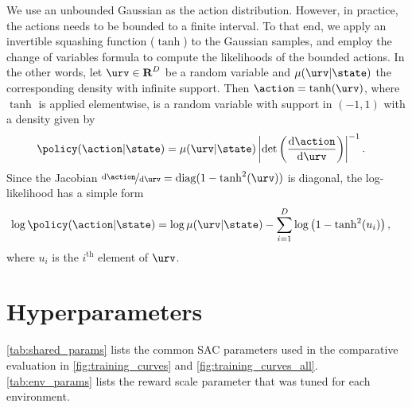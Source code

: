 \documentclass{article}
\begin{document}
%
We use an unbounded Gaussian as the action distribution. However, in practice, the actions needs to be bounded to a finite interval. To that end, we
apply an invertible squashing function 
($\tanh$) to the Gaussian samples, and employ the change of variables formula to compute the likelihoods of the bounded actions. In the other words, let $\urv\in\reals^D$ be a random variable and $\mu(\urv|\state)$ the corresponding density with infinite support. Then $\action = \tanh(\urv)$, where $\tanh$ is applied elementwise, is a random variable with support in $(-1, 1)$ with a density given by
\begin{align}
\policy (\action|\state) &= \mu(\urv|\state)\left|\det \left(\frac{\mathrm{d}\action}{\mathrm{d}\urv} \right)\right|^{-1}.
\end{align}
Since the Jacobian $\nicefrac{\mathrm{d}\action}{\mathrm{d}\urv} = \mathrm{diag}(1 - \tanh^2(\urv))$ is diagonal, the log-likelihood has a simple form 
%
\begin{align}
\log\policy (\action|\state) &= \log \mu(\urv|\state) - \sum_{i=1}^D\log\left(1 - \tanh^2(u_i)\right),
\end{align}
where $u_i$ is the $i^\mathrm{th}$ element of $\urv$.





%
%

%

%
%

%
%

%
%

%
%

%
%

%
%



\newpage
\section{Hyperparameters}
\label{app:hypers}
\autoref{tab:shared_params} lists the common SAC parameters used in the comparative evaluation in \autoref{fig:training_curves} and \autoref{fig:training_curves_all}. \autoref{tab:env_params} lists the reward scale parameter that was tuned for each environment.
\end{document}
